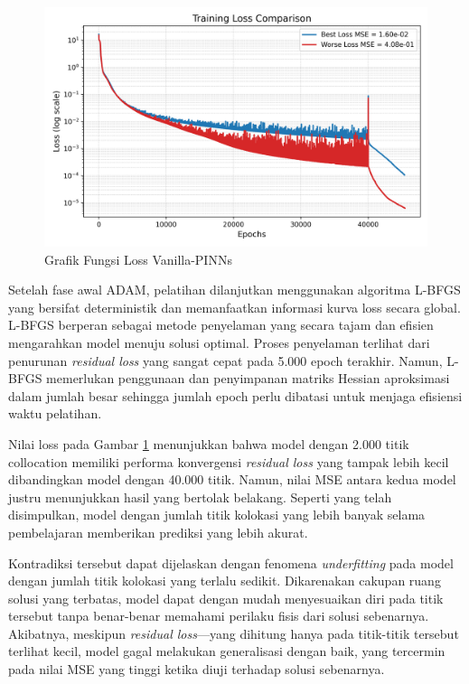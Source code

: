 \begin{figure}[htbp]
    \centering
    \includegraphics[width=0.9 \linewidth]{Gambar/Loss-Comparison.png}
    \caption{Grafik Fungsi Loss Vanilla-PINNs}
    \label{fig:loss-PINNs}
\end{figure}

Setelah fase awal ADAM, pelatihan dilanjutkan menggunakan algoritma L-BFGS yang bersifat deterministik dan memanfaatkan informasi kurva loss secara global. L-BFGS berperan sebagai metode penyelaman yang secara tajam dan efisien mengarahkan model menuju solusi optimal. Proses penyelaman terlihat dari penurunan \emph{residual loss} yang sangat cepat pada 5.000 epoch terakhir. Namun, L-BFGS memerlukan penggunaan dan penyimpanan matriks Hessian aproksimasi dalam jumlah besar sehingga jumlah epoch perlu dibatasi untuk menjaga efisiensi waktu pelatihan.

Nilai loss pada Gambar \ref{fig:loss-PINNs} menunjukkan bahwa model dengan 2.000 titik collocation memiliki performa konvergensi \emph{residual loss} yang tampak lebih kecil dibandingkan model dengan 40.000 titik. Namun, nilai MSE antara kedua model justru menunjukkan hasil yang bertolak belakang. Seperti yang telah disimpulkan, model dengan jumlah titik kolokasi yang lebih banyak selama pembelajaran memberikan prediksi yang lebih akurat. 

Kontradiksi tersebut dapat dijelaskan dengan fenomena \emph{underfitting} pada model dengan jumlah titik kolokasi yang terlalu sedikit. Dikarenakan cakupan ruang solusi yang terbatas, model dapat dengan mudah menyesuaikan diri pada titik tersebut tanpa benar-benar memahami perilaku fisis dari solusi sebenarnya. Akibatnya, meskipun \emph{residual loss}—yang dihitung hanya pada titik-titik tersebut terlihat kecil, model gagal melakukan generalisasi dengan baik, yang tercermin pada nilai MSE yang tinggi ketika diuji terhadap solusi sebenarnya.

